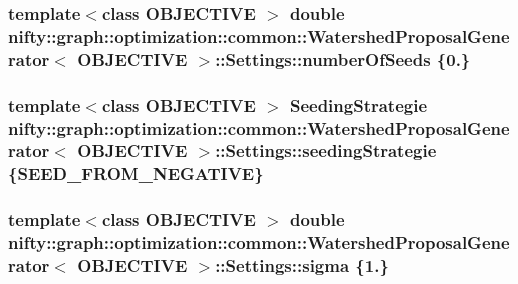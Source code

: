 \subsubsection[{number\+Of\+Seeds}]{\setlength{\rightskip}{0pt plus 5cm}template$<$class O\+B\+J\+E\+C\+T\+I\+V\+E $>$ double {\bf nifty\+::graph\+::optimization\+::common\+::\+Watershed\+Proposal\+Generator}$<$ O\+B\+J\+E\+C\+T\+I\+V\+E $>$\+::Settings\+::number\+Of\+Seeds \{0.\}}\label{structnifty_1_1graph_1_1optimization_1_1common_1_1WatershedProposalGenerator_1_1Settings_acfa710008cb4cfcfbdae26c9975fc41c}
\hypertarget{structnifty_1_1graph_1_1optimization_1_1common_1_1WatershedProposalGenerator_1_1Settings_a9c4db55b498ef7326e415fbfadefd8d6}{}
\subsubsection[{seeding\+Strategie}]{\setlength{\rightskip}{0pt plus 5cm}template$<$class O\+B\+J\+E\+C\+T\+I\+V\+E $>$ {\bf Seeding\+Strategie} {\bf nifty\+::graph\+::optimization\+::common\+::\+Watershed\+Proposal\+Generator}$<$ O\+B\+J\+E\+C\+T\+I\+V\+E $>$\+::Settings\+::seeding\+Strategie \{{\bf S\+E\+E\+D\+\_\+\+F\+R\+O\+M\+\_\+\+N\+E\+G\+A\+T\+I\+V\+E}\}}\label{structnifty_1_1graph_1_1optimization_1_1common_1_1WatershedProposalGenerator_1_1Settings_a9c4db55b498ef7326e415fbfadefd8d6}
\hypertarget{structnifty_1_1graph_1_1optimization_1_1common_1_1WatershedProposalGenerator_1_1Settings_a979e41cf56d9e77b041418a432ec3a98}{}
\subsubsection[{sigma}]{\setlength{\rightskip}{0pt plus 5cm}template$<$class O\+B\+J\+E\+C\+T\+I\+V\+E $>$ double {\bf nifty\+::graph\+::optimization\+::common\+::\+Watershed\+Proposal\+Generator}$<$ O\+B\+J\+E\+C\+T\+I\+V\+E $>$\+::Settings\+::sigma \{1.\}}\label{structnifty_1_1graph_1_1optimization_1_1common_1_1WatershedProposalGenerator_1_1Settings_a979e41cf56d9e77b041418a432ec3a98}



